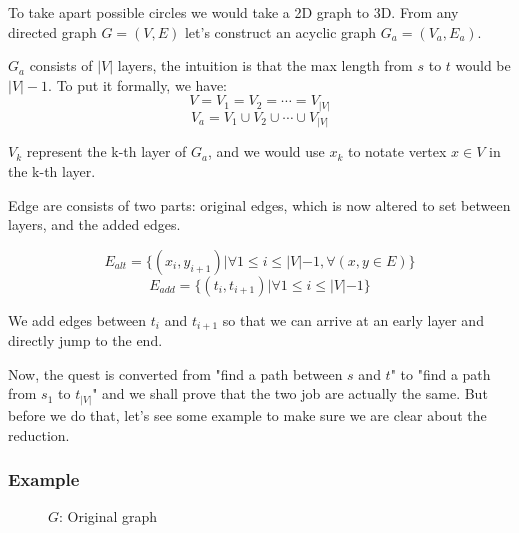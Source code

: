 To take apart possible circles we would take a 2D graph to 3D.
From any directed graph $G = (V, E)$ let's construct an acyclic graph $G_a = (V_a, E_a)$.

$G_a$ consists of $|V|$ layers, the intuition is that the max length from $s$ to $t$ would be $|V| - 1$.
To put it formally, we have:
$$V = V_1 = V_2 = \cdots = V_{|V|}$$
$$V_a = V_1 \cup V_2 \cup \cdots \cup V_{|V|}$$

$V_k$ represent the k-th layer of $G_a$, and we would use $x_k$ to notate vertex $x \in V$ in the k-th layer.

Edge are consists of two parts: original edges, which is now altered to set between layers, and the added edges.

$$E_{alt} = \{(x_i, y_{i+1}) | \forall 1 \le i \le |V| - 1, \forall (x, y \in E)\}$$
$$E_{add} = \{(t_i, t_{i+1}) | \forall 1 \le i \le |V| - 1\}$$

We add edges between $t_i$ and $t_{i+1}$ so that we can arrive at an early layer and directly jump to the end.

Now, the quest is converted from "find a path between $s$ and $t$" to "find a path from $s_1$ to $t_{|V|}$" and we shall prove that the two job are actually the same.
But before we do that, let's see some example to make sure we are clear about the reduction.

\subsubsection*{Example}
\begin{figure}[h]
    \centering
    \caption{$G$: Original graph}
\end{figure}

